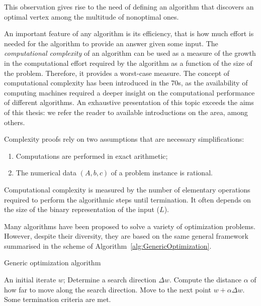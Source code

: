 This observation gives rise to the need of defining an algorithm
that discovers an optimal vertex among the multitude of nonoptimal ones.

An important feature of any algorithm is its efficiency, that is 
how much effort is needed for the algorithm to provide an answer
given some input.
The {\em computational complexity} of an algorithm can be used as a measure
of the growth in the computational effort required by the algorithm
as a function of the size of the problem. Therefore, it provides 
a worst-case measure.
The concept of computational complexity has been introduced in the 70s,
as the availability of computing machines required a deeper insight
on the computational performance of different algorithms.
An exhaustive presentation of this topic exceeds the aims of this thesis:
we refer the reader to available introductions on the area, 
\cite[ch.~2]{Schrijver86} among others.

Complexity proofs rely on two assumptions that are necessary 
simplifications:
\begin{enumerate}
\item Computations are performed in exact arithmetic;
\item The numerical data $(A, b, c)$ of a problem instance is rational.
\end{enumerate}

Computational complexity is measured by the number of elementary operations
required to perform the algorithmic steps until termination. It often depends 
on the size of the binary representation of the input ($L$).

Many algorithms have been proposed to solve a variety of optimization
problems. However, despite their diversity, they are based on the same 
general framework summarised in the scheme of 
Algorithm~\ref{alg:GenericOptimization}.

\renewcommand{\algorithmicrequire}{\textbf{Given:}}
\renewcommand{\algorithmicrepeat}{\textbf{Repeat:}}
\renewcommand{\algorithmicuntil}{\textbf{Until}}
\begin{algorithm}[h]
  \caption{Generic optimization algorithm}
    \begin{algorithmic}  \label{alg:GenericOptimization}
      \REQUIRE An initial iterate $w$;
      \smallskip
      \REPEAT
         \STATE Determine a search direction $\Delta w$.
         \STATE Compute the distance $\alpha$ of how far to move along
	        the search direction.
         \STATE Move to the next point $w + \alpha\Delta w$.
      \UNTIL Some termination criteria are met.
  \end{algorithmic}
\end{algorithm}

